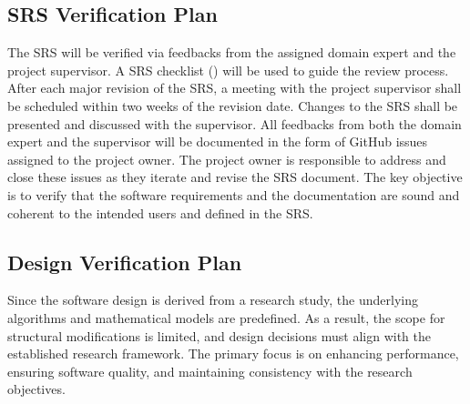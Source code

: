 \documentclass[12pt, titlepage]{article}
\begin{document}




\subsection{SRS Verification Plan}

The SRS will be verified via feedbacks from the assigned domain expert and the
project supervisor. A SRS checklist (\cite{SRS_checklist}) will be used to guide
the review process. After each major revision of the SRS, a meeting with the
project supervisor shall be scheduled within two weeks of the revision date.
Changes to the SRS shall be presented and discussed with the supervisor. All
feedbacks from both the domain expert and the supervisor will be documented in
the form of GitHub issues assigned to the project owner. The project owner is
responsible to address and close these issues as they iterate and revise the SRS
document. The key objective is to verify that the software requirements and the
documentation are sound and coherent to the intended users and defined in the
SRS.

\subsection{Design Verification Plan}

Since the software design is derived from a research study, the underlying
algorithms and mathematical models are predefined. As a result, the scope for
structural modifications is limited, and design decisions must align with the
established research framework. The primary focus is on enhancing performance,
ensuring software quality, and maintaining consistency with the research
objectives.
\end{document}
